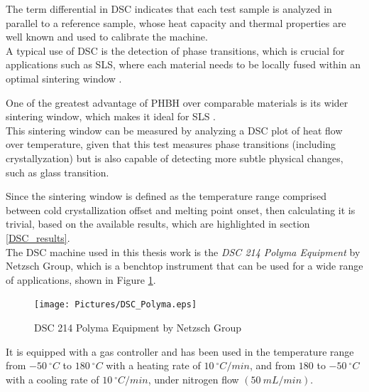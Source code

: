 \documentclass[a4paper]{article}
\begin{document}
            
            The term differential in DSC indicates that each test sample is analyzed in parallel to a reference sample, whose heat capacity and 
            thermal properties are well known and used to calibrate the machine. \\
            
            A typical use of DSC is the detection of phase transitions, which is crucial for applications such as SLS, where each material 
            needs to be locally fused within an optimal sintering window \autocites{Padovano_SLS_Review,SLS_3dprinting_biomedical_polymers}. 
    
            One of the greatest advantage of PHBH over comparable materials is its wider sintering window, which makes it ideal 
            for SLS \autocites{Kovalcik_PHA_Review,Eraslan_PHBH_review}. \\ 
    
            This sintering window can be measured by analyzing a DSC plot of heat flow over temperature, given that this test measures 
            phase transitions (including crystallyzation) but is also capable of detecting more subtle physical changes, such as glass transition. 
    
            Since the sintering window is defined as the temperature range comprised between cold crystallization offset and 
            melting point onset, then calculating it is trivial, based on the available results, which are highlighted in section \ref{DSC_results}. \\ 

                The DSC machine used in this thesis work is the \textit{DSC 214 Polyma Equipment} by Netzsch Group, which is a benchtop instrument that can be used for 
                a wide range of applications, shown in Figure \ref{fig:DSC_polyma}. \\  

                    \begin{figure}[H]
                        \centering
                        \texttt{[image: Pictures/DSC\_Polyma.eps]}
                        \caption{DSC 214 Polyma Equipment by Netzsch Group}
                        \label{fig:DSC_polyma}
                    \end{figure}

                It is equipped with a gas controller and has been used in the temperature range from $-50 \ ^{\circ} C$ 
                to $180 \ ^{\circ} C$ with 
                a heating rate of $10 \ ^{\circ}C/min$, and from $180$ to $-50 \ ^{\circ}C$ with a cooling rate of $10  \ ^{\circ}C/min$, 
                under nitrogen flow $(50 \ mL/min)$. \\ 
\end{document}
